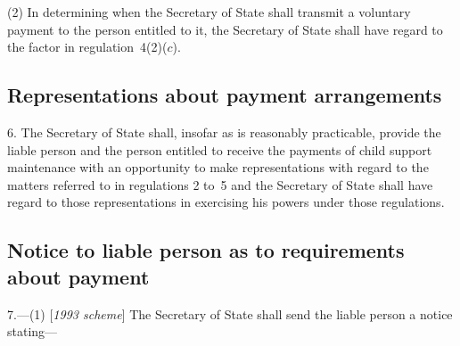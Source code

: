 \documentclass[12pt,a4paper]{article}
\begin{document}
(2) In determining when the Secretary of State shall transmit a voluntary payment to the person entitled to it, the Secretary of State shall have regard to the factor in regulation~4(2)($c$).


\subsection[6. Representations about payment arrangements]{Representations about payment arrangements}

6.  The Secretary of State shall, insofar as is reasonably practicable, provide the liable person and the person entitled to receive the payments of child support maintenance with an opportunity to make representations with regard to the matters referred to in regulations 2 to~5 and the Secretary of State shall have regard to those representations in exercising his powers under those regulations.

\subsection[7. Notice to liable person as to requirements about payment]{Notice to liable person as to requirements about payment}

7.—(1) [\emph{1993 scheme}] The Secretary of State shall send the liable person a notice stating—
\end{document}
